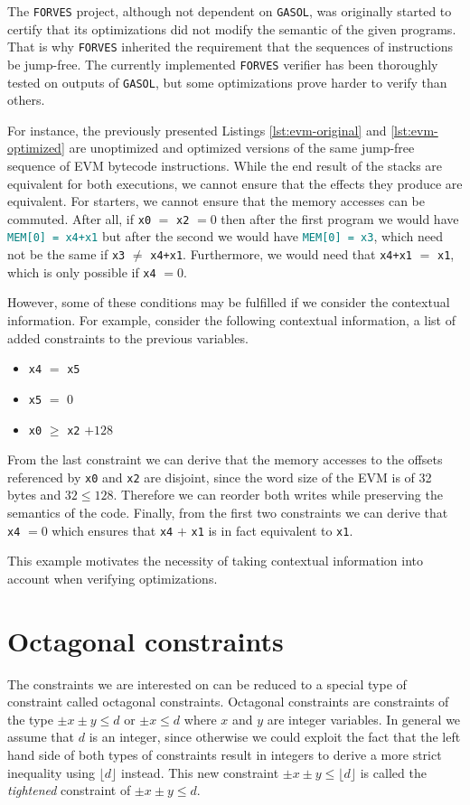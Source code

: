 The \verb|FORVES| project, although not dependent on \verb|GASOL|, was originally started
to certify that its optimizations did not modify the semantic of the given programs. That is
why \verb|FORVES| inherited the requirement that the sequences of instructions be jump-free.
The currently implemented \verb|FORVES| verifier has been thoroughly tested on outputs of
\verb|GASOL|, but some optimizations prove harder to verify than others. 

For instance, the previously presented Listings \ref{lst:evm-original} and \ref{lst:evm-optimized}
are unoptimized and optimized versions of the same jump-free sequence of EVM bytecode 
instructions. While the end result of the stacks are equivalent for both executions, we cannot
ensure that the effects they produce are equivalent. For starters, we cannot ensure that the 
memory accesses can be commuted. After all, if \verb|x0| $=$ \verb|x2| $= 0$ then after the 
first program we would have {\textcolor{teal}{\texttt{MEM[0]~=~x4+x1}}} but after the second 
we would have {\textcolor{teal}{\texttt{MEM[0]~=~x3}}}, which need not be the same if 
\verb|x3| $\ne$ \verb|x4+x1|. Furthermore, we would need that \verb|x4+x1| $=$ \verb|x1|, which 
is only possible if \verb|x4| $= 0$.

However, some of these conditions may be fulfilled if we consider the contextual information.
For example, consider the following contextual information, a list of added constraints to the
previous variables.

\begin{itemize}
    \item \verb|x4| $=$ \verb|x5|
    \item \verb|x5| $=$ 0
    \item \verb|x0| $\ge$ \verb|x2| $+ 128$
\end{itemize}

From the last constraint we can derive that the memory accesses to the offsets
referenced by \verb|x0| and \verb|x2| are disjoint, since the word size of the EVM is of 32 bytes and 
$32 \le 128$. Therefore we can reorder both writes while preserving the semantics of the code.
Finally, from the first two constraints we can derive that \verb|x4| $= 0$ which ensures that \verb|x4| $+$ 
\verb|x1| is in fact equivalent to \verb|x1|.

This example motivates the necessity of taking contextual information into account when verifying
optimizations.

\section{Octagonal constraints}
The constraints we are interested on can be reduced to a special type of constraint called
octagonal constraints. Octagonal constraints are constraints of the type ${\pm x \pm y \le d}$ 
or $\pm x \le d$ where $x$ and $y$ are integer variables. In general we assume that $d$ is an
integer, since otherwise we could exploit the fact that the left hand side of both types of
constraints result in integers to derive a more strict inequality using $\lfloor d \rfloor$
instead. This new constraint $\pm x \pm y \le \lfloor d \rfloor$ is called the \emph{tightened}
constraint of $\pm x \pm y \le d$.

